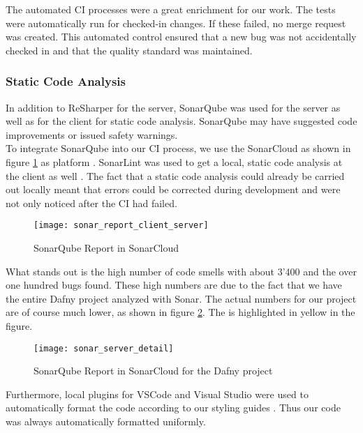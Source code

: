 The automated CI processes were a great enrichment for our work.
The tests were automatically run for checked-in changes.
If these failed, no merge request was created.
This automated control ensured that a new bug was not accidentally checked in
and that the quality standard was maintained.

\subsubsection{Static Code Analysis}
In addition to ReSharper for the server, SonarQube was used for the server as well as for the client for static code analysis.
SonarQube may have suggested code improvements or issued safety warnings. \\

To integrate SonarQube into our CI process, we use the SonarCloud as shown in figure \ref{fig:sonarcloud_report}
as platform \cite{sonarcloud}.
SonarLint was used to get a local, static code analysis at the client as well \cite{sonar-lint}.
The fact that a static code analysis could already be carried out locally meant that errors
could be corrected during development and were not only noticed after the CI had failed.

\begin{figure}[H]
    \centering
    \texttt{[image: sonar\_report\_client\_server]}
    \caption{SonarQube Report in SonarCloud}
    \label{fig:sonarcloud_report}
\end{figure}

What stands out is the high number of code smells with about 3'400
and the over one hundred bugs found.
These high numbers are due to the fact that we have the entire Dafny project analyzed with Sonar.
The actual numbers for our project are of course much lower,
as shown in figure \ref{fig:sonar_server_detail}.
The  is highlighted in yellow in the figure.

\begin{figure}[H]
    \centering
    \texttt{[image: sonar\_server\_detail]}
    \caption{SonarQube Report in SonarCloud for the Dafny project}
    \label{fig:sonar_server_detail}
\end{figure}

Furthermore, local plugins for VSCode and Visual Studio were used to automatically
format the code according to our styling guides \cite{dev}.
Thus our code was always automatically formatted uniformly. \\


